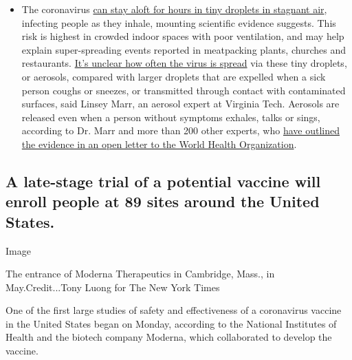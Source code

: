 \begin{itemize}
  \begin{itemize}
  \tightlist
  \item
    The coronavirus
    \href{https://www.nytimes.com/2020/07/04/health/239-experts-with-one-big-claim-the-coronavirus-is-airborne.html?action=click\&pgtype=Article\&state=default\&region=MAIN_CONTENT_3\&context=storylines_faq}{can
    stay aloft for hours in tiny droplets in stagnant air}, infecting
    people as they inhale, mounting scientific evidence suggests. This
    risk is highest in crowded indoor spaces with poor ventilation, and
    may help explain super-spreading events reported in meatpacking
    plants, churches and restaurants.
    \href{https://www.nytimes.com/2020/07/06/health/coronavirus-airborne-aerosols.html?action=click\&pgtype=Article\&state=default\&region=MAIN_CONTENT_3\&context=storylines_faq}{It's
    unclear how often the virus is spread} via these tiny droplets, or
    aerosols, compared with larger droplets that are expelled when a
    sick person coughs or sneezes, or transmitted through contact with
    contaminated surfaces, said Linsey Marr, an aerosol expert at
    Virginia Tech. Aerosols are released even when a person without
    symptoms exhales, talks or sings, according to Dr. Marr and more
    than 200 other experts, who
    \href{https://academic.oup.com/cid/article/doi/10.1093/cid/ciaa939/5867798}{have
    outlined the evidence in an open letter to the World Health
    Organization}.
  \end{itemize}
\end{itemize}

\hypertarget{a-late-stage-trial-of-a-potential-vaccine-will-enroll-people-at-89-sites-around-the-united-states}{%
\subsection{A late-stage trial of a potential vaccine will enroll people
at 89 sites around the United
States.}\label{a-late-stage-trial-of-a-potential-vaccine-will-enroll-people-at-89-sites-around-the-united-states}}

Image

The entrance of Moderna Therapeutics in Cambridge, Mass., in
May.Credit...Tony Luong for The New York Times

One of the first large studies of safety and effectiveness of a
coronavirus vaccine in the United States began on Monday, according to
the National Institutes of Health and the biotech company Moderna, which
collaborated to develop the vaccine.

